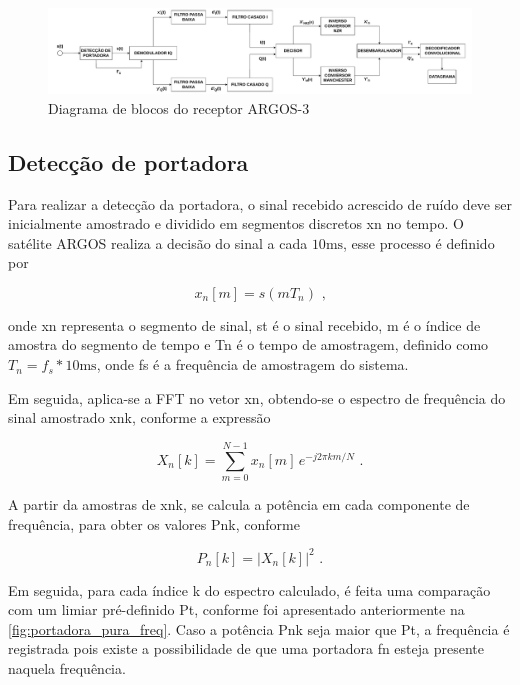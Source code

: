 \begin{figure}[H]
	\centering
	\caption{Diagrama de blocos do receptor ARGOS-3}\label{fig:diagrama_receptor}
	\includegraphics[width=\linewidth]{assets/cap2/receptor.pdf}
\end{figure}


\subsection{Detecção de portadora}

Para realizar a detecção da portadora, o sinal recebido acrescido de ruído deve ser inicialmente amostrado e dividido em segmentos discretos \gls{xn} no tempo. O satélite \gls{ARGOS} realiza a decisão do sinal a cada $10 \text{ms}$, esse processo é definido por 

\vspace{-0.4em}
\begin{equation}
    x_n[m] = s(mT_n) \text{ ,}
\end{equation}

\noindent onde \gls{xn} representa o segmento de sinal, \gls{st} é o sinal recebido, \gls{m} é o índice de amostra do segmento de tempo e \gls{Tn} é o tempo de amostragem, definido como $T_n = f_s * 10 \text{ms}$, onde \gls{fs} é a frequência de amostragem do sistema. 


Em seguida, aplica-se a \gls{FFT} no vetor \gls{xn}, obtendo-se o espectro de frequência do sinal amostrado \gls{xnk}, conforme a expressão 

\vspace{-0.4em}
\begin{equation}
    X_n[k] = \sum_{m=0}^{N-1} x_n[m]\, e^{-j2\pi km/N} \text{ .}
\end{equation}

A partir da amostras de \gls{xnk}, se calcula a potência em cada componente de frequência, para obter os valores \gls{Pnk}, conforme

\vspace{-0.4em}
\begin{equation}
    P_n[k] = |X_n[k]|^2 \text{ .}
\end{equation}

Em seguida, para cada índice \gls{k} do espectro calculado, é feita uma comparação com um limiar pré-definido \gls{Pt}, conforme foi apresentado anteriormente na \autoref{fig:portadora_pura_freq}. Caso a potência \gls{Pnk} seja maior que \gls{Pt}, a frequência é registrada pois existe a possibilidade de que uma portadora \gls{fn} esteja presente naquela frequência. 

